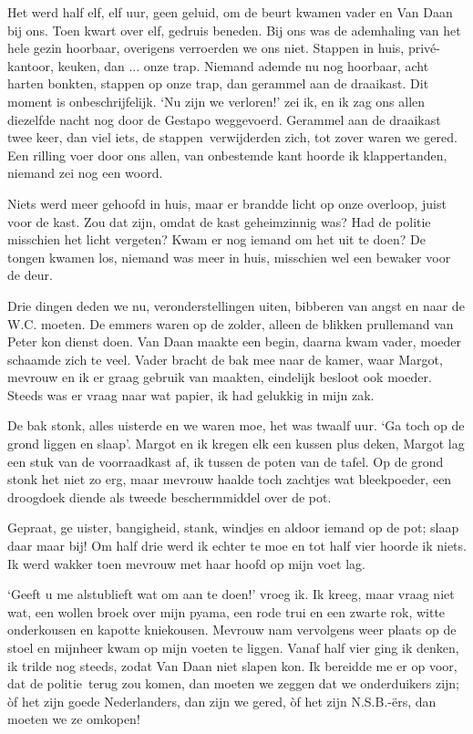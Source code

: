 \documentclass{book}
\begin{document}
Het werd half elf, elf uur, geen geluid, om de beurt kwamen vader en Van
Daan bij ons. Toen kwart over elf, gedruis beneden. Bij ons was de
ademhaling van het hele gezin hoorbaar, overigens verroerden we ons
niet. Stappen in huis, privé-kantoor, keuken, dan ... onze trap. Niemand
ademde nu nog hoorbaar, acht harten bonkten, stappen op onze trap, dan
gerammel aan de draaikast. Dit moment is onbeschrijfelijk. `Nu zijn we
verloren!' zei ik, en ik zag ons allen diezelfde nacht nog door de
Gestapo weggevoerd. Gerammel aan de draaikast twee keer, dan viel iets,
de stappen~verwijderden zich, tot zover waren we gered. Een rilling voer
door ons allen, van onbestemde kant hoorde ik klappertanden, niemand zei
nog een woord.

Niets werd meer gehoofd in huis, maar er brandde licht op onze overloop,
juist voor de kast. Zou dat zijn, omdat de kast geheimzinnig was? Had de
politie misschien het licht vergeten? Kwam er nog iemand om het uit te
doen? De tongen kwamen los, niemand was meer in huis, misschien wel een
bewaker voor de deur.

Drie dingen deden we nu, veronderstellingen uiten, bibberen van angst en
naar de W.C. moeten. De emmers waren op de zolder, alleen de blikken
prullemand van Peter kon dienst doen. Van Daan maakte een begin, daarna
kwam vader, moeder schaamde zich te veel. Vader bracht de bak mee naar
de kamer, waar Margot, mevrouw en ik er graag gebruik van maakten,
eindelijk besloot ook moeder. Steeds was er vraag naar wat papier, ik
had gelukkig in mijn zak.

De bak stonk, alles uisterde en we waren moe, het was twaalf uur. `Ga
toch op de grond liggen en slaap'. Margot en ik kregen elk een kussen
plus deken, Margot lag een stuk van de voorraadkast af, ik tussen de
poten van de tafel. Op de grond stonk het niet zo erg, maar mevrouw
haalde toch zachtjes wat bleekpoeder, een droogdoek diende als tweede
beschermmiddel over de pot.

Gepraat, ge uister, bangigheid, stank, windjes en aldoor iemand op de
pot; slaap daar maar bij! Om half drie werd ik echter te moe en tot half
vier hoorde ik niets. Ik werd wakker toen mevrouw met haar hoofd op mijn
voet lag.

`Geeft u me alstublieft wat om aan te doen!' vroeg ik. Ik kreeg, maar
vraag niet wat, een wollen broek over mijn pyama, een rode trui en een
zwarte rok, witte onderkousen en kapotte kniekousen. Mevrouw nam
vervolgens weer plaats op de stoel en mijnheer kwam op mijn voeten te
liggen. Vanaf half vier ging ik denken, ik trilde nog steeds, zodat Van
Daan niet slapen kon. Ik bereidde me er op voor, dat de politie~terug
zou komen, dan moeten we zeggen dat we onderduikers zijn; òf het zijn
goede Nederlanders, dan zijn we gered, òf het zijn N.S.B.-ërs, dan
moeten we ze omkopen!
\end{document}
